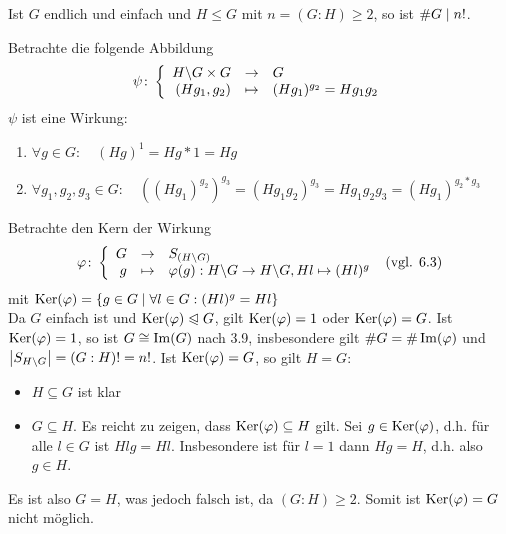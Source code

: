 \begin{exercisePage}
    \pagebreak
	\begin{exercise}
		Ist $G$ endlich und einfach und $H \leq G$ mit $n = (G:H) \geq 2$, so ist $\# G \mathrel{\mid} n!$.
	\end{exercise}
	\begin{solution}
		Betrachte die folgende Abbildung
		\begin{align*}
			\psi \colon \left\lbrace \begin{array}{rcl} H \backslash G \times G & \to & G \\(Hg_1, g_2) & \mapsto & (Hg_1)^{g_2} = H g_1 g_2 \end{array} \right.
		\end{align*}
		$\psi$ ist eine Wirkung:
		\begin{enumerate}[label=(\roman*)]
			\item $\forall g \in G : \quad (Hg)^1 = Hg*1 = Hg$
			\item $\forall g_1, g_2, g_3 \in G: \quad \left((Hg_1)^{g_2}\right)^{g_3} = \left( Hg_1 g_2 \right)^{g_3} = H g_1 g_2 g_3 = \left( H g_1 \right)^{g_2 * g_3}$
		\end{enumerate}
		Betrachte den Kern der Wirkung 
		\begin{align*}
			\varphi \colon \left\lbrace \begin{array}{rcl} G & \to & S_{(H \backslash G)} \\g & \mapsto & \varphi(g) : H \backslash G \to H \backslash G, Hl \mapsto (Hl)^g \end{array} \right. \text{ (vgl. 6.3)}
		\end{align*}
		mit $\operatorname{Ker}(\varphi) = \left\{ g \in G \mid \forall l \in G : (Hl)^g = Hl \right\}$ \\
		Da $G$ einfach ist und $\operatorname{Ker}(\varphi) \mathrel{\trianglelefteqslant} G$, gilt $\operatorname{Ker}(\varphi) = 1$ oder $\operatorname{Ker}(\varphi) = G$. Ist $\operatorname{Ker}(\varphi) = 1$, so ist $G \mathrel{\cong} \operatorname{Im}(G)$ nach 3.9, insbesondere gilt $\# G = \# \operatorname{Im}(\varphi)$ und $\left| S_{H \backslash G} \right| = (G:H)! = n!$. Ist $\operatorname{Ker}(\varphi) = G$, so gilt $H = G$:
		\begin{itemize}
			\item $H \subseteq G$ ist klar
			\item $G \subseteq H$. Es reicht zu zeigen, dass $\operatorname{Ker}(\varphi) \subseteq H$ gilt. Sei $g \in \operatorname{Ker}(\varphi)$, d.h. für alle $l \in G$ ist $Hlg = Hl$. Insbesondere ist für $l=1$ dann $Hg=H$, d.h. also $g \in H$.
		\end{itemize}
	Es ist also $G=H$, was jedoch falsch ist, da $(G:H) \geq 2$. Somit ist $\operatorname{Ker}(\varphi) = G$ nicht möglich.
	\end{solution}


\end{exercisePage}
